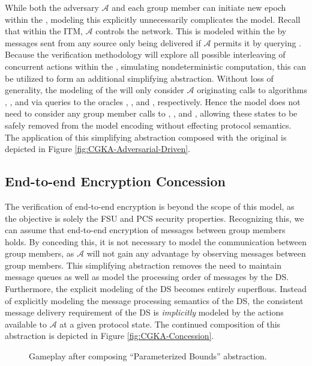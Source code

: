 \documentclass[runningheads]{llncs}
\newcommand{\Abrev}[1]{\gls{#1}}
\newcommand{\Adversary}{\ensuremath{\mathcal{A}}\xspace}
\begin{document}
While both the adversary \Adversary and each group member can initiate new epoch within the \CGKAsec, modeling this explicitly unnecessarily complicates the model.
Recall that within the \Abrev{ITM}, \Adversary controls the network.
This is modeled within the \CGKAsec by messages sent from any source only being delivered if \Adversary permits it by querying .
Because the verification methodology will explore all possible interleaving of concurrent actions within the \CGKAsec, simulating nondeterministic computation, this can be utilized to form an additional simplifying abstraction.
Without loss of generality, the modeling of the \CGKAsec will only consider \Adversary originating calls to algorithms , , and  via queries to the oracles , , and , respectively.
Hence the model does not need to consider any group member calls to , , and , allowing these states to be safely removed from the model encoding without effecting protocol semantics.
The application of this simplifying abstraction composed with the original \CGKAsec is depicted in Figure \ref{fig:CGKA-Adversarial-Driven}.


\subsection{End-to-end Encryption Concession}

The verification of end-to-end encryption is beyond the scope of this model, as the objective is solely the \Abrev{FSU} and \Abrev{PCS} security properties.
Recognizing this, we can assume that end-to-end encryption of messages between group members holds.
By conceding this, it is not necessary to model the communication between group members, as \Adversary will not gain any advantage by observing messages between group members.
This simplifying abstraction removes the need to maintain message queues as well as model the processing order of messages by the \Abrev{DS}.
Furthermore, the explicit modeling of the \Abrev{DS} becomes entirely superflous.
Instead of explicitly modeling the message processing semantics of the \Abrev{DS}, the consistent message delivery requirement  of the \Abrev{DS} is \emph{implicitly} modeled by the actions available to \Adversary at a given protocol state.
The continued composition of this abstraction is depicted in Figure \ref{fig:CGKA-Concession}.

\begin{figure}%
\centering
{}
\caption[Transition graph of informal CGKA definition]{%
\label{fig:CGKA-Concession}%
Gameplay after composing ``End-to-end Encryption Concession'' abstraction.%
}%
\vfill
{}
\caption[Transition graph of informal CGKA definition]{%
\label{fig:CGKA-Parameterized}%
Gameplay after composing ``Parameterized Bounds'' abstraction.%
}%
\end{figure}
\end{document}
